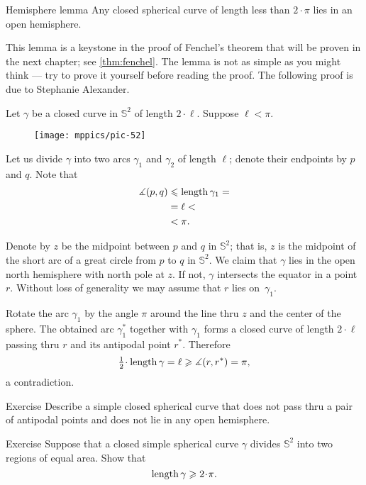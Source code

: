 \begin{thm}{Hemisphere lemma}\label{lem:hemisphere}
Any closed spherical curve of length less than $2\cdot \pi$ lies in an open hemisphere. 
\end{thm}

This lemma is a keystone in the proof of Fenchel's theorem that will be proven in the next chapter; see \ref{thm:fenchel}.
The lemma is not as simple as you might think --- try to prove it yourself before reading the proof.
The following proof is due to Stephanie Alexander.

Let $\gamma$ be a closed curve in $\mathbb{S}^2$ of length $2\cdot\ell$.
Suppose $\ell<\pi$.


\begin{wrapfigure}[8]{o}{35mm}
\vskip-0mm
\centering
\texttt{[image: mppics/pic-52]}
\end{wrapfigure}

Let us divide $\gamma$ into two arcs $\gamma_1$ and $\gamma_2$ of length $\ell$;
denote their endpoints by $p$ and $q$. 
Note that 
\begin{align*}
\measuredangle(p,q)&\leqslant \mathop{\rm length}\nolimits \gamma_1=
\\
&= \ell<
\\
&<\pi.
\end{align*}

Denote by $z$ be the midpoint between $p$ and $q$ in $\mathbb{S}^2$;
that is, $z$ is the midpoint of the short arc of a great circle from $p$ to $q$ in $\mathbb{S}^2$. 
We claim that $\gamma$ lies in the open north hemisphere with north pole at $z$.  
If not, $\gamma$ intersects the equator in a point $r$.
Without loss of generality we may assume that $r$ lies on~$\gamma_1$. 

Rotate the arc $\gamma_1$ by the angle $\pi$ around the line thru $z$ and the center of the sphere.
The obtained arc $\gamma_1^{*}$ together with $\gamma_1$ forms a closed curve of length $2\cdot \ell$ passing thru $r$ and its antipodal point $r^{*}$.
Therefore
\[\tfrac12\cdot\length \gamma=\ell\ge \measuredangle(r,r^{*})=\pi,\] 
a contradiction.
\qeds

\begin{thm}{Exercise}\label{ex:antipodal}
Describe a simple closed spherical curve that does not pass thru a pair of antipodal points and does not lie in any open  hemisphere.
\end{thm}


\begin{thm}{Exercise}\label{ex:bisection-of-S2}
Suppose that a closed simple spherical curve $\gamma$ divides $\mathbb{S}^2$ into two regions of equal area.
Show that 
\[\length\gamma\ge2\cdot\pi.\]
\end{thm}


